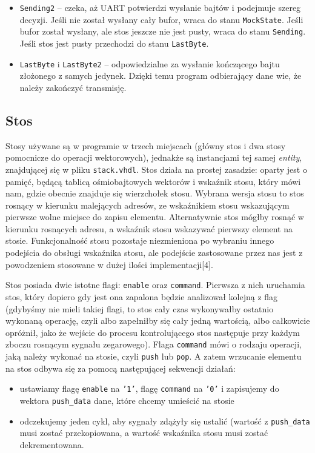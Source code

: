 \begin{itemize}
  \item \texttt{Sending2} -- czeka, aż UART potwierdzi wysłanie bajtów i podejmuje szereg decyzji. Jeśli nie został wysłany cały bufor, wraca do stanu \texttt{MockState}. Jeśli bufor został wysłany, ale stos jeszcze nie jest pusty, wraca do stanu \texttt{Sending}. Jeśli stos jest pusty przechodzi do stanu \texttt{LastByte}.
  \item \texttt{LastByte} i \texttt{LastByte2} -- odpowiedzialne za wysłanie kończącego bajtu złożonego z samych jedynek. Dzięki temu program odbierający dane wie, że należy zakończyć transmisję.
\end{itemize}

\subsection{Stos}

Stosy używane są w programie w trzech miejscach (główny stos i dwa stosy pomocnicze do operacji wektorowych), jednakże są instancjami tej samej \textit{entity}, znajdującej się w pliku \texttt{stack.vhdl}. Stos działa na prostej zasadzie: oparty jest o pamięć, będącą tablicą ośmiobajtowych wektorów i wskaźnik stosu, który mówi nam, gdzie obecnie znajduje się wierzchołek stosu. Wybrana wersja stosu to stos rosnący w kierunku malejących adresów, ze wskaźnikiem stosu wskazującym pierwsze wolne miejsce do zapisu elementu. Alternatywnie stos mógłby rosnąć w kierunku rosnących adresu, a wskaźnik stosu wskazywać pierwszy element na stosie. Funkcjonalność stosu pozostaje niezmieniona po wybraniu innego podejścia do obsługi wskaźnika stosu, ale podejście zastosowane przez nas jest z powodzeniem stosowane w dużej ilości implementacji[4].

Stos posiada dwie istotne flagi: \texttt{enable} oraz \texttt{command}. Pierwsza z nich uruchamia stos, który dopiero gdy jest ona zapalona będzie analizował kolejną z flag (gdybyśmy nie mieli takiej flagi, to stos cały czas wykonywałby ostatnio wykonaną operację, czyli albo zapełniłby się cały jedną wartością, albo całkowicie opróżnił, jako że wejście do procesu kontrolującego stos następuje przy każdym zboczu rosnącym sygnału zegarowego). Flaga \texttt{command} mówi o rodzaju operacji, jaką należy wykonać na stosie, czyli \texttt{push} lub \texttt{pop}. A zatem wrzucanie elementu na stos odbywa się za pomocą następującej sekwencji działań:

\begin{itemize}
  \item ustawiamy flagę \texttt{enable} na \texttt{'1'}, flagę \texttt{command} na \texttt{'0'} i zapisujemy do wektora \texttt{push\_data} dane, które chcemy umieścić na stosie
  \item odczekujemy jeden cykl, aby sygnały zdążyły się ustalić (wartość z \texttt{push\_data} musi zostać przekopiowana, a wartość wskaźnika stosu musi zostać dekrementowana.
\end{itemize}

